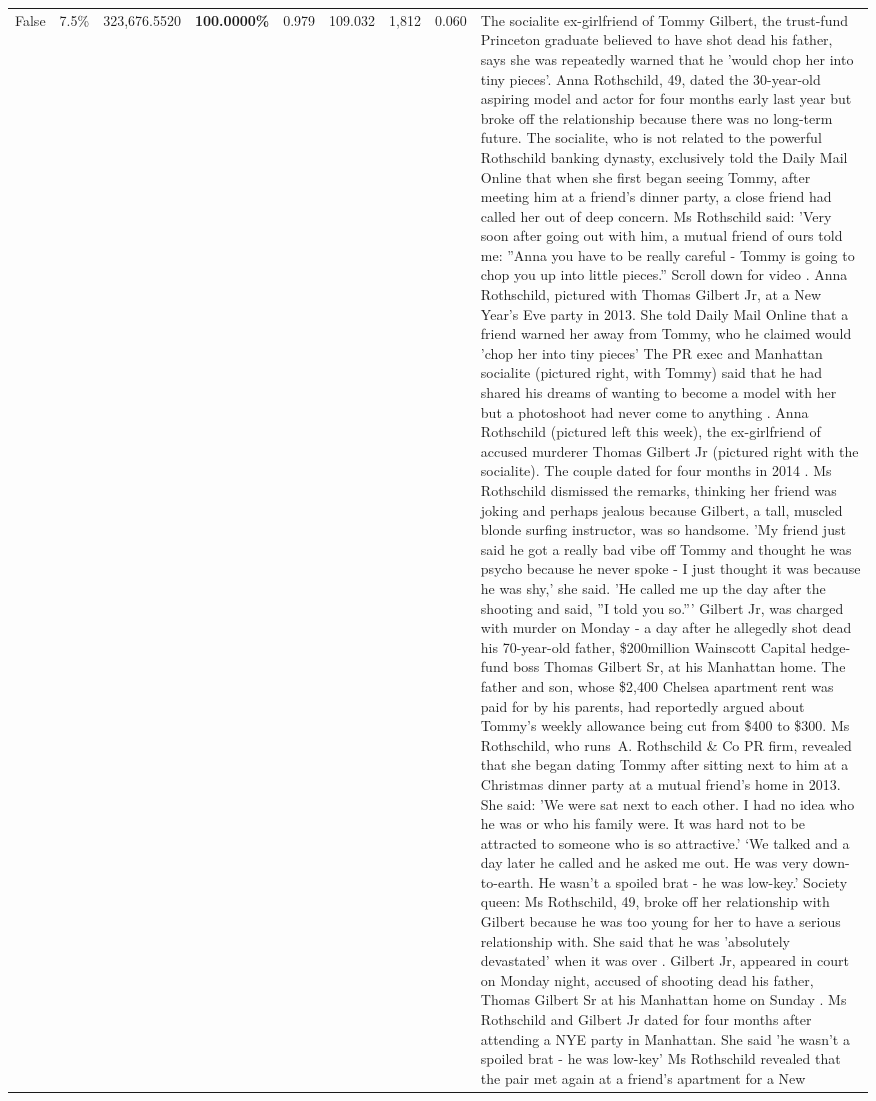 \begin{table}[H]
\begin{tabular}{lllrlllll}
False & 7.5\% & 323,676.5520 & \bfseries \color{red} 100.0000\% & 0.979 & 109.032 & 1,812 & 0.060 & The socialite ex-girlfriend of Tommy Gilbert, the trust-fund Princeton graduate believed to have shot dead his father, says she was repeatedly warned that he 'would chop her into tiny pieces'. Anna Rothschild, 49, dated the 30-year-old aspiring model and actor for four months early last year but broke off the relationship because there was no long-term future. The socialite, who is not related to the powerful Rothschild banking dynasty, exclusively told the Daily Mail Online that when she first began seeing Tommy, after meeting him at a friend's dinner party, a close friend had called her out of deep concern. Ms Rothschild said: 'Very soon after going out with him, a mutual friend of ours told me: ''Anna you have to be really careful - Tommy is going to chop you up into little pieces.'' Scroll down for video . Anna Rothschild, pictured with Thomas Gilbert Jr, at a New Year's Eve party in 2013. She told Daily Mail Online that a friend warned her away from Tommy, who he claimed would 'chop her into tiny pieces' The PR exec and Manhattan socialite (pictured right, with Tommy) said that he had shared his dreams of wanting to become a model with her but a photoshoot had never come to anything . Anna Rothschild (pictured left this week), the ex-girlfriend of accused murderer Thomas Gilbert Jr (pictured right with the socialite). The couple dated for four months in 2014 . Ms Rothschild dismissed the remarks, thinking her friend was joking and perhaps jealous because Gilbert, a tall, muscled blonde surfing instructor, was so handsome. 'My friend just said he got a really bad vibe off Tommy and thought he was psycho because he never spoke - I just thought it was because he was shy,' she said. 'He called me up the day after the shooting and said, ''I told you so.''' Gilbert Jr, was charged with murder on Monday - a day after he allegedly shot dead his 70-year-old father, \$200million Wainscott Capital hedge-fund boss Thomas Gilbert Sr, at his Manhattan home. The father and son, whose \$2,400 Chelsea apartment rent was paid for by his parents, had reportedly argued about Tommy's weekly allowance being cut from \$400 to \$300. Ms Rothschild, who runs A. Rothschild \& Co PR firm, revealed that she began dating Tommy after sitting next to him at a Christmas dinner party at a mutual friend's home in 2013. She said: 'We were sat next to each other. I had no idea who he was or who his family were. It was hard not to be attracted to someone who is so attractive.' ‘We talked and a day later he called and he asked me out. He was very down-to-earth. He wasn’t a spoiled brat - he was low-key.’ Society queen: Ms Rothschild, 49, broke off her relationship with Gilbert because he was too young for her to have a serious relationship with. She said that he was 'absolutely devastated' when it was over . Gilbert Jr, appeared in court on Monday night, accused of shooting dead his father, Thomas Gilbert Sr at his Manhattan home on Sunday . Ms Rothschild and Gilbert Jr dated for four months after attending a NYE party in Manhattan. She said 'he wasn't a spoiled brat - he was low-key' Ms Rothschild revealed that the pair met again at a friend’s apartment for a New 
\end{tabular}
\end{table}
